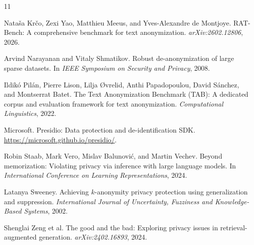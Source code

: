 \documentclass[10pt,twocolumn]{article}
\begin{document}

\begin{thebibliography}{11}

Nata{\v{s}}a Kr{\v{c}}o, Zexi Yao, Matthieu Meeus, and Yves-Alexandre de Montjoye.
\newblock RAT-Bench: A comprehensive benchmark for text anonymization.
\newblock \emph{arXiv:2602.12806}, 2026.

Arvind Narayanan and Vitaly Shmatikov.
\newblock Robust de-anonymization of large sparse datasets.
\newblock In \emph{IEEE Symposium on Security and Privacy}, 2008.

Ildikó Pilán, Pierre Lison, Lilja {\O}vrelid, Anthi Papadopoulou, David S{\'a}nchez, and Montserrat Batet.
\newblock The Text Anonymization Benchmark (TAB): A dedicated corpus and evaluation framework for text anonymization.
\newblock \emph{Computational Linguistics}, 2022.

Microsoft.
\newblock Presidio: Data protection and de-identification SDK.
\newblock \url{https://microsoft.github.io/presidio/}.

Robin Staab, Mark Vero, Mislav Balunovi{\'c}, and Martin Vechev.
\newblock Beyond memorization: Violating privacy via inference with large language models.
\newblock In \emph{International Conference on Learning Representations}, 2024.

Latanya Sweeney.
\newblock Achieving $k$-anonymity privacy protection using generalization and suppression.
\newblock \emph{International Journal of Uncertainty, Fuzziness and Knowledge-Based Systems}, 2002.

Shenglai Zeng et al.
\newblock The good and the bad: Exploring privacy issues in retrieval-augmented generation.
\newblock \emph{arXiv:2402.16893}, 2024.

\end{thebibliography}
\end{document}
